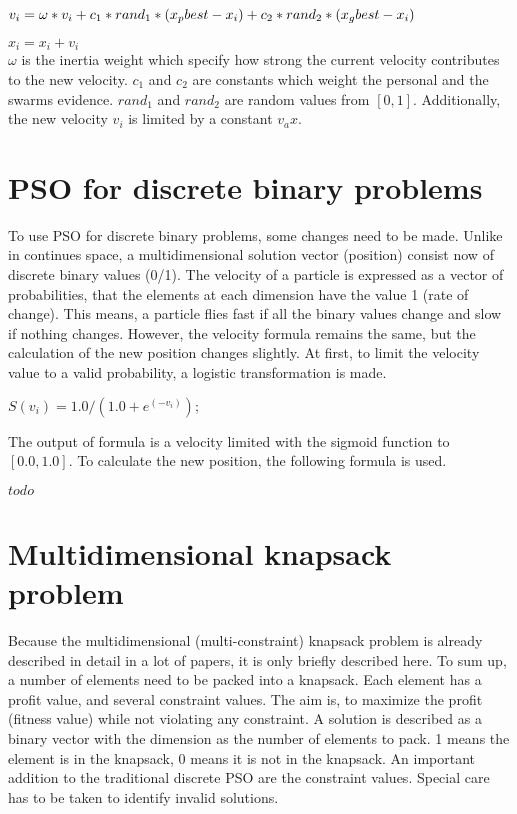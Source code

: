\documentclass{article}
\begin{document}
\begin{math}
\label{formula-1}
v_i = \omega * v_i + c_1 * rand_1 * (x_pbest - x_i) + c_2 * rand_2 * (x_gbest - x_i) \\
\end{math}

\begin{math}
\label{formula-2}
x_i = x_i + v_i
\end{math}
\\
$\omega$ is the inertia weight which specify how strong the current velocity contributes to the new velocity. $c_1$ and $c_2$ are constants which weight the personal and the swarms evidence. $rand_1$ and $rand_2$ are random values from $[0,1]$. Additionally, the new velocity $v_i$ is limited by a constant $v_ax$.

\section{PSO for discrete binary problems}
\label{lbl-pso-disc}
To use PSO for discrete binary problems, some changes need to be made. Unlike in continues space, a multidimensional solution vector (position) consist now of discrete binary values (0/1). The velocity of a particle is expressed as a vector of probabilities, that the elements at each dimension have the value 1 (rate of change). This means, a particle flies fast if all the binary values change and slow if nothing changes. However, the velocity formula remains the same, but the calculation of the new position changes slightly. At first, to limit the velocity value to a valid probability, a logistic transformation is made.

\begin{math}
S(v_i) = 1.0 / (1.0 + e^{(-v_i)});
\end{math}

The output of formula is a velocity limited with the sigmoid function to $[0.0, 1.0]$. To calculate the new position, the following formula is used.

\begin{math}
todo
\end{math}

\section{Multidimensional knapsack problem}
\label{lbl-mknap}
Because the multidimensional (multi-constraint) knapsack problem is already described in detail in a lot of papers, it is only briefly described here. To sum up, a number of elements need to be packed into a knapsack. Each element has a profit value, and several constraint values. The aim is, to maximize the profit (fitness value) while not violating any constraint. A solution is described as a binary vector with the dimension as the number of elements to pack. 1 means the element is in the knapsack, 0 means it is not in the knapsack. An important addition to the traditional discrete PSO are the constraint values. Special care has to be taken to identify invalid solutions.
\end{document}
